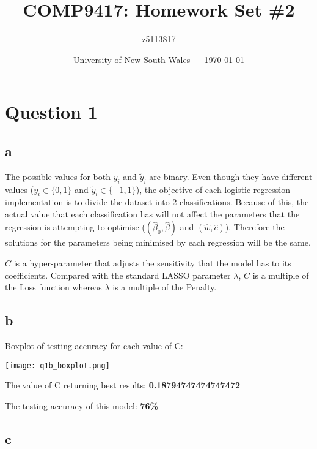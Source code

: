 \documentclass{article}
\title{COMP9417: Homework Set \#2} %
\author{z5113817} %
\date{University of New South Wales --- \today} %
\begin{document}
\maketitle %


\section*{Question 1}

\subsection*{a} 
The possible values for both \(y_{i}\) and \(\tilde{y}_{i}\) are binary. Even though they have different values
(\(y_{i}\in\{0,1\}\) and \(\tilde{y}_{i}\in\{-1,1\}\)), the objective of each logistic regression implementation 
is to divide the dataset into 2 classifications. Because of this, the actual value that each classification has 
will not affect the parameters that the regression is attempting to optimise (\((\hat{\beta}_{0}, \hat{\beta})\) and
\((\hat{w}, \hat{c})\)). Therefore the solutions for the parameters being minimised by each regression will be the 
same.

\(C\) is a hyper-parameter that adjusts the sensitivity that the model has to its coefficients. Compared with the
standard LASSO parameter \(\lambda\), \(C\) is a multiple of the Loss function whereas \(\lambda\) is a multiple
of the Penalty.

\subsection*{b}
\label{1b}

Boxplot of testing accuracy for each value of C:

\texttt{[image: q1b\_boxplot.png]}

The value of C returning best results: \textbf{0.18794747474747472}

The testing accuracy of this model: \textbf{76\%}

\newpage

\subsection*{c}
\end{document}
